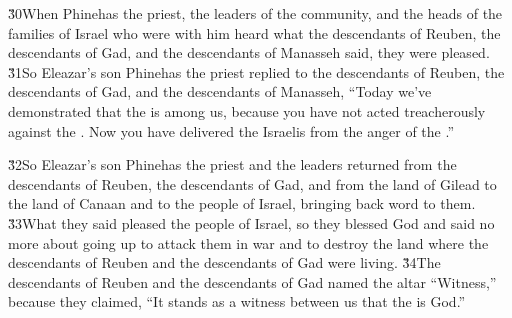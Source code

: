 \v{30}When Phinehas the priest, the leaders of the community, and the heads of the families of Israel who were with him heard what the descendants of Reuben, the descendants of Gad, and the descendants of Manasseh said, they were pleased. \v{31}So Eleazar's son Phinehas the priest replied to the descendants of Reuben, the descendants of Gad, and the descendants of Manasseh, ``Today we've demonstrated that the  is among us, because you have not acted treacherously against the . Now you have delivered the Israelis from the anger of the .''

\v{32}So Eleazar's son Phinehas the priest and the leaders returned from the descendants of Reuben, the descendants of Gad, and from the land of Gilead to the land of Canaan and to the people of Israel, bringing back word to them. \v{33}What they said pleased the people of Israel, so they blessed God and said no more about going up to attack them in war and to destroy the land where the descendants of Reuben and the descendants of Gad were living. \v{34}The descendants of Reuben and the descendants of Gad named the altar ``Witness,'' because they claimed, ``It stands as a witness between us that the  is God.''

